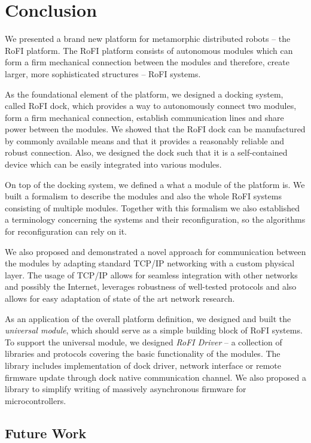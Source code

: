 \chapter{Conclusion}\label{chap:conclusion}

We presented a brand new platform for metamorphic distributed robots -- the RoFI
platform. The RoFI platform consists of autonomous modules which can form a
firm mechanical connection between the modules and therefore, create larger,
more sophisticated structures -- RoFI systems.

As the foundational element of the platform, we designed a docking system,
called RoFI dock, which provides a way to autonomously connect two modules, form
a firm mechanical connection, establish communication lines and share power
between the modules. We showed that the RoFI dock can be manufactured by
commonly available means and that it provides a reasonably reliable and robust
connection. Also, we designed the dock such that it is a self-contained device
which can be easily integrated into various modules.

On top of the docking system, we defined a what a module of the platform is. We
built a formalism to describe the modules and also the whole RoFI systems
consisting of multiple modules. Together with this formalism we also established
a terminology concerning the systems and their reconfiguration, so the
algorithms for reconfiguration can rely on it.

We also proposed and demonstrated a novel approach for communication between the
modules by adapting standard TCP/IP networking with a custom physical layer. The
usage of TCP/IP allows for seamless integration with other networks and possibly
the Internet, leverages robustness of well-tested protocols and also allows for
easy adaptation of state of the art network research.

As an application of the overall platform definition, we designed and built the
\emph{universal module}, which should serve as a simple building block of RoFI
systems. To support the universal module, we designed \emph{RoFI Driver} -- a
collection of libraries and protocols covering the basic functionality of the
modules. The library includes implementation of dock driver, network interface
or remote firmware update through dock native communication channel. We also
proposed a library to simplify writing of massively asynchronous firmware for
microcontrollers.

\section{Future Work}

